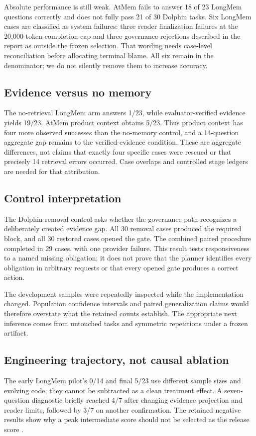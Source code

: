 \documentclass[11pt]{article}
\begin{document}
Absolute performance is still weak. AtMem fails to answer 18 of 23 LongMem questions correctly and does not fully pass 21 of 30 Dolphin tasks. Six LongMem cases are classified as system failures: three reader finalization failures at the 20,000-token completion cap and three governance rejections described in the report as outside the frozen selection. That wording needs case-level reconciliation before allocating terminal blame. All six remain in the denominator; we do not silently remove them to increase accuracy.

\subsection{Evidence versus no memory}
The no-retrieval LongMem arm answers 1/23, while evaluator-verified evidence yields 19/23. AtMem product context obtains 5/23. Thus product context has four more observed successes than the no-memory control, and a 14-question aggregate gap remains to the verified-evidence condition. These are aggregate differences, not claims that exactly four specific cases were rescued or that precisely 14 retrieval errors occurred. Case overlaps and controlled stage ledgers are needed for that attribution.

\subsection{Control interpretation}
The Dolphin removal control asks whether the governance path recognizes a deliberately created evidence gap. All 30 removal cases produced the required block, and all 30 restored cases opened the gate. The combined paired procedure completed in 29 cases, with one provider failure. This result tests responsiveness to a named missing obligation; it does not prove that the planner identifies every obligation in arbitrary requests or that every opened gate produces a correct action.

The development samples were repeatedly inspected while the implementation changed. Population confidence intervals and paired generalization claims would therefore overstate what the retained counts establish. The appropriate next inference comes from untouched tasks and symmetric repetitions under a frozen artifact.

\subsection{Engineering trajectory, not causal ablation}
The early LongMem pilot's 0/14 and final 5/23 use different sample sizes and evolving code; they cannot be subtracted as a clean treatment effect. A seven-question diagnostic briefly reached 4/7 after changing evidence projection and reader limits, followed by 3/7 on another confirmation. The retained negative results show why a peak intermediate score should not be selected as the release score \citep{history}.
\end{document}
